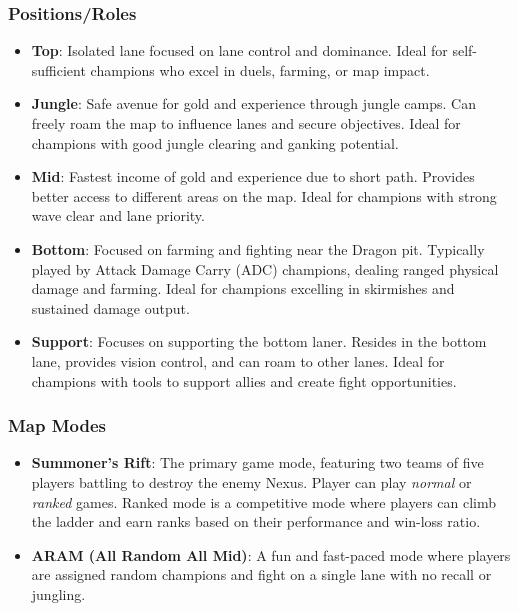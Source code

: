 \documentclass[11pt,a4paper,oneside]{report}
\begin{document}
\subsubsection{Positions/Roles}

\begin{itemize}
  \item \textbf{Top}: Isolated lane focused on lane control and dominance. Ideal for self-sufficient champions who excel in duels, farming, or map impact.

  \item \textbf{Jungle}: Safe avenue for gold and experience through jungle camps. Can freely roam the map to influence lanes and secure objectives. Ideal for champions with good jungle clearing and ganking potential.

  \item \textbf{Mid}: Fastest income of gold and experience due to short path. Provides better access to different areas on the map. Ideal for champions with strong wave clear and lane priority.

  \item \textbf{Bottom}: Focused on farming and fighting near the Dragon pit. Typically played by Attack Damage Carry (ADC) champions, dealing ranged physical damage and farming. Ideal for champions excelling in skirmishes and sustained damage output.

  \item \textbf{Support}: Focuses on supporting the bottom laner. Resides in the bottom lane, provides vision control, and can roam to other lanes. Ideal for champions with tools to support allies and create fight opportunities.
\end{itemize}

\subsubsection{Map Modes}

\begin{itemize}
  \item \textbf{Summoner's Rift}: The primary game mode, featuring two teams of five players battling to destroy the enemy Nexus. Player can play \textit{normal} or \textit{ranked} games. Ranked mode is a competitive mode where players can climb the ladder and earn ranks based on their performance and win-loss ratio.
  \item \textbf{ARAM (All Random All Mid)}: A fun and fast-paced mode where players are assigned random champions and fight on a single lane with no recall or jungling.
\end{itemize}
\end{document}

